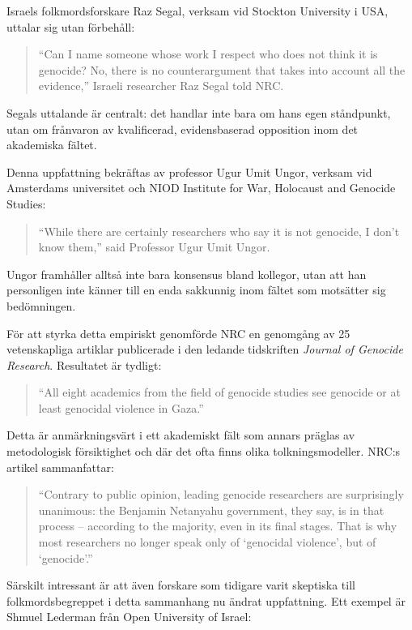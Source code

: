\documentclass[12pt]{article}
\begin{document}
Israels folkmordsforskare Raz Segal, verksam vid Stockton University i USA, uttalar sig utan förbehåll:

\begin{quote}
“Can I name someone whose work I respect who does not think it is genocide? No, there is no counterargument that takes into account all the evidence,” Israeli researcher Raz Segal told NRC.
\end{quote}

Segals uttalande är centralt: det handlar inte bara om hans egen ståndpunkt, utan om frånvaron av kvalificerad, evidensbaserad opposition inom det akademiska fältet.

Denna uppfattning bekräftas av professor Ugur Umit Ungor, verksam vid Amsterdams universitet och NIOD Institute for War, Holocaust and Genocide Studies:

\begin{quote}
“While there are certainly researchers who say it is not genocide, I don’t know them,” said Professor Ugur Umit Ungor.
\end{quote}

Ungor framhåller alltså inte bara konsensus bland kollegor, utan att han personligen inte känner till en enda sakkunnig inom fältet som motsätter sig bedömningen.

För att styrka detta empiriskt genomförde NRC en genomgång av 25 vetenskapliga artiklar publicerade i den ledande tidskriften \textit{Journal of Genocide Research}. Resultatet är tydligt:

\begin{quote}
“All eight academics from the field of genocide studies see genocide or at least genocidal violence in Gaza.”
\end{quote}

Detta är anmärkningsvärt i ett akademiskt fält som annars präglas av metodologisk försiktighet och där det ofta finns olika tolkningsmodeller. NRC:s artikel sammanfattar:

\begin{quote}
“Contrary to public opinion, leading genocide researchers are surprisingly unanimous: the Benjamin Netanyahu government, they say, is in that process – according to the majority, even in its final stages. That is why most researchers no longer speak only of ‘genocidal violence’, but of ‘genocide’.”
\end{quote}

Särskilt intressant är att även forskare som tidigare varit skeptiska till folkmordsbegreppet i detta sammanhang nu ändrat uppfattning. Ett exempel är Shmuel Lederman från Open University of Israel:
\end{document}
